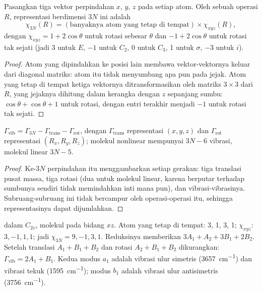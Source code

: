\begin{proposition}\label{prop:b3:group-theory-applied:gamma-3n}
Pasangkan tiga vektor perpindahan $x$, $y$, $z$ pada setiap atom. Oleh sebuah
operasi $R$,  representasi berdimensi $3N$ ini adalah
\[
\chi_{3N}(R) = (\text{banyaknya atom yang tetap di tempat}) \times \chi_{xyz}(R),
\]
dengan $\chi_{xyz} = 1 + 2\cos\theta$ untuk rotasi sebesar $\theta$ dan
$-1 + 2\cos\theta$ untuk rotasi tak sejati (jadi 3 untuk $E$, $-1$ untuk $C_2$,
0 untuk $C_3$, 1 untuk $\sigma$, $-3$ untuk $i$).
\end{proposition}

\begin{proof}
Atom yang dipindahkan ke posisi lain membawa vektor-vektornya keluar dari
diagonal matriks: atom itu tidak menyumbang apa pun pada jejak. Atom yang
tetap di tempat ketiga vektornya ditransformasikan oleh matriks $3\times3$
dari $R$, yang jejaknya dihitung dalam kerangka dengan $z$ sepanjang sumbu:
$\cos\theta + \cos\theta + 1$ untuk rotasi, dengan entri terakhir menjadi $-1$
untuk rotasi tak sejati.
\end{proof}

\begin{proposition}\label{prop:b3:group-theory-applied:mode-count}
$\Gamma_{\mathrm{vib}} = \Gamma_{3N} - \Gamma_{\mathrm{trans}} - \Gamma_{\mathrm{rot}}$, dengan
$\Gamma_{\mathrm{trans}}$ representasi $(x, y, z)$ dan $\Gamma_{\mathrm{rot}}$ representasi
$(R_x, R_y, R_z)$; molekul nonlinear mempunyai $3N - 6$ vibrasi, molekul
linear $3N - 5$.
\end{proposition}

\begin{proof}
Ke-$3N$ perpindahan itu menggambarkan setiap gerakan: tiga translasi pusat
massa, tiga rotasi (dua untuk molekul linear, karena berputar terhadap
sumbunya sendiri tidak memindahkan inti mana pun), dan vibrasi-vibrasinya.
Subruang-subruang ini tidak bercampur oleh operasi-operasi itu, sehingga
representasinya dapat dijumlahkan.
\end{proof}

\begin{example}[Air]\label{ex:b3:group-theory-applied:water}
 dalam $C_{2v}$, molekul pada bidang $xz$. Atom yang tetap di tempat: 3,
1, 3, 1; $\chi_{xyz}$: $3, -1, 1, 1$; jadi $\chi_{3N} = 9, -1, 3, 1$. Reduksinya
memberikan $3A_1 +
A_2 + 3B_1 + 2B_2$. Setelah translasi $A_1 + B_1 + B_2$ dan rotasi $A_2 + B_1 + B_2$
dikurangkan: $\Gamma_{\mathrm{vib}} = 2A_1 + B_1$. Kedua modus $a_1$ adalah
vibrasi ulur simetris (\qty{3657}{cm^{-1}}) dan vibrasi tekuk
(\qty{1595}{cm^{-1}}); modus $b_1$ adalah vibrasi ulur antisimetris
(\qty{3756}{cm^{-1}}).
\end{example}

